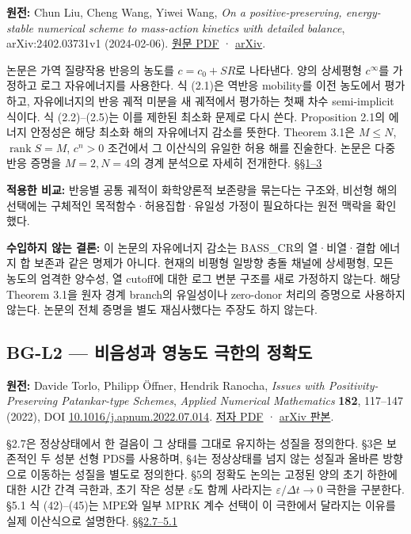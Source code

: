 \textbf{원전:} Chun Liu, Cheng Wang, Yiwei Wang, \emph{On a positive-preserving, energy-stable numerical scheme to mass-action kinetics with detailed balance}, arXiv:2402.03731v1 (2024-02-06). \href{https://arxiv.org/pdf/2402.03731}{원문 PDF} · \href{https://arxiv.org/abs/2402.03731}{arXiv}.

논문은 가역 질량작용 반응의 농도를 \(c=c_0+SR\)로 나타낸다. 양의 상세평형 \(c^\infty\)를 가정하고 로그 자유에너지를 사용한다. 식 (2.1)은 역반응 mobility를 이전 농도에서 평가하고, 자유에너지의 반응 궤적 미분을 새 궤적에서 평가하는 첫째 차수 semi-implicit 식이다. 식 (2.2)--(2.5)는 이를 제한된 최소화 문제로 다시 쓴다. Proposition 2.1의 에너지 안정성은 해당 최소화 해의 자유에너지 감소를 뜻한다. Theorem 3.1은 \(M\le N\), \(\operatorname{rank}S=M\), \(c^n>0\) 조건에서 그 이산식의 유일한 허용 해를 진술한다. 논문은 다중 반응 증명을 \(M=2,N=4\)의 경계 분석으로 자세히 전개한다. \href{https://arxiv.org/pdf/2402.03731}{§§1--3}

\textbf{적용한 비교:} 반응별 공통 궤적이 화학양론적 보존량을 묶는다는 구조와, 비선형 해의 선택에는 구체적인 목적함수·허용집합·유일성 가정이 필요하다는 원전 맥락을 확인했다.

\textbf{수입하지 않는 결론:} 이 논문의 자유에너지 감소는 BASS\_CR의 열·비열·결합 에너지 합 보존과 같은 명제가 아니다. 현재의 비평형 일방향 충돌 채널에 상세평형, 모든 농도의 엄격한 양수성, 열 cutoff에 대한 로그 변분 구조를 새로 가정하지 않는다. 해당 Theorem 3.1을 원자 경계 branch의 유일성이나 zero-donor 처리의 증명으로 사용하지 않는다. 논문의 전체 증명을 별도 재심사했다는 주장도 하지 않는다.

\hypertarget{bg-l2-uxbe44uxc74cuxc131uxacfc-uxc601uxb18duxb3c4-uxadf9uxd55cuxc758-uxc815uxd655uxb3c4}{%
\subsection{BG-L2 --- 비음성과 영농도 극한의 정확도}\label{bg-l2-uxbe44uxc74cuxc131uxacfc-uxc601uxb18duxb3c4-uxadf9uxd55cuxc758-uxc815uxd655uxb3c4}}

\textbf{원전:} Davide Torlo, Philipp Öffner, Hendrik Ranocha, \emph{Issues with Positivity-Preserving Patankar-type Schemes}, \emph{Applied Numerical Mathematics} \textbf{182}, 117--147 (2022), DOI \href{https://doi.org/10.1016/j.apnum.2022.07.014}{10.1016/j.apnum.2022.07.014}. \href{https://davidetorlo.it/files/publications/Torlo2021StabilityPatankar.pdf}{저자 PDF} · \href{https://arxiv.org/html/2108.07347v4}{arXiv 판본}.

§2.7은 정상상태에서 한 걸음이 그 상태를 그대로 유지하는 성질을 정의한다. §3은 보존적인 두 성분 선형 PDS를 사용하며, §4는 정상상태를 넘지 않는 성질과 올바른 방향으로 이동하는 성질을 별도로 정의한다. §5의 정확도 논의는 고정된 양의 초기 하한에 대한 시간 간격 극한과, 초기 작은 성분 \(\varepsilon\)도 함께 사라지는 \(\varepsilon/\Delta t\to0\) 극한을 구분한다. §5.1 식 (42)--(45)는 MPE와 일부 MPRK 계수 선택이 이 극한에서 달라지는 이유를 실제 이산식으로 설명한다. \href{https://davidetorlo.it/files/publications/Torlo2021StabilityPatankar.pdf}{§§2.7--5.1}

